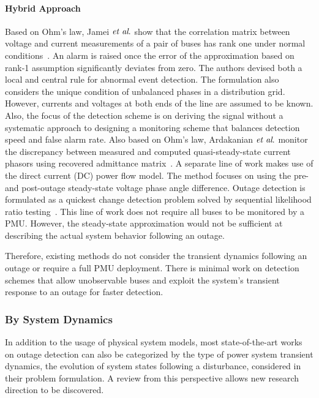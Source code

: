 \paragraph{Hybrid Approach}
Based on Ohm’s law, Jamei $\textit{et al}.$ show that the correlation matrix between voltage and current measurements of a pair of buses has rank one under normal conditions~\cite{Jamei2017a}. An alarm is raised once the error of the approximation based on rank-1 assumption significantly deviates from zero. The authors devised both a local and central rule for abnormal event detection. The formulation also considers the unique condition of unbalanced phases in a distribution grid. However, currents and voltages at both ends of the line are assumed to be known. Also, the focus of the detection scheme is on deriving the signal without a systematic approach to designing a monitoring scheme that balances detection speed and false alarm rate. 
Also based on Ohm’s law, Ardakanian $\textit{et al}.$ monitor the discrepancy between measured and computed quasi-steady-state current phasors using recovered admittance matrix~\cite{Ardakanian2019a}. 
A separate line of work makes use of the direct current (DC) power flow model. The method focuses on using the pre- and post-outage steady-state voltage phase angle difference. Outage detection is formulated as a quickest change detection problem solved by sequential likelihood ratio testing~\cite{Chen2016,Babakmehr2016}. 
This line of work does not require all buses to be monitored by a PMU. However, the steady-state approximation would not be sufficient at describing the actual system behavior following an outage.

Therefore, existing methods do not consider the transient dynamics following an outage or require a full PMU deployment. There is minimal work on detection schemes that allow unobservable buses and exploit the system's transient response to an outage for faster detection.

\subsubsection{By System Dynamics} %
\label{ssub:by_dynamics}

In addition to the usage of physical system models, most state-of-the-art works on outage detection can also be categorized by the type of power system transient dynamics, the evolution of system states following a disturbance, considered in their problem formulation. A review from this perspective allows new research direction to be discovered.

